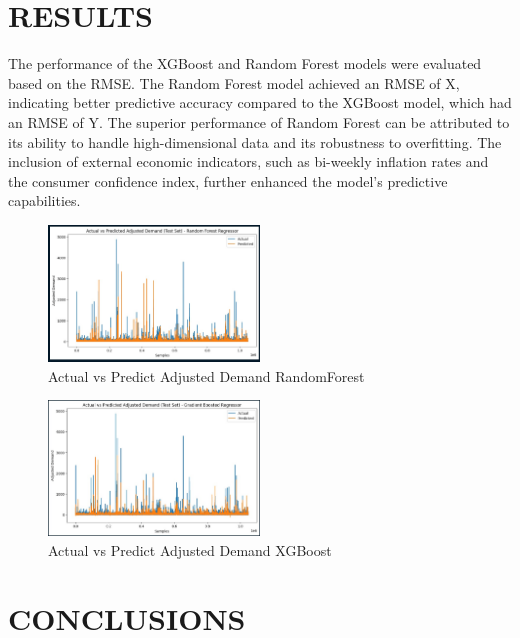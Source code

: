 \documentclass[letterpaper, 10 pt, conference]{ieeeconf}  %
\begin{document}
\section{RESULTS}
The performance of the XGBoost and Random Forest models were evaluated based on the RMSE. The Random Forest model achieved an RMSE of X, indicating better predictive accuracy compared to the XGBoost model, which had an RMSE of Y. The superior performance of Random Forest can be attributed to its ability to handle high-dimensional data and its robustness to overfitting. The inclusion of external economic indicators, such as bi-weekly inflation rates and the consumer confidence index, further enhanced the model's predictive capabilities.

\begin{figure}[H] 
        \begin{center}
        \centering
        \includegraphics[width=0.5\textwidth]{images/comparison.jpg}
        \caption{Actual vs Predict Adjusted Demand RandomForest}
        \end{center}
\end{figure} 

\begin{figure}[H] 
        \begin{center}
        \centering
        \includegraphics[width=0.5\textwidth]{images/comparisonxg.jpg}
        \caption{Actual vs Predict Adjusted Demand XGBoost}
        \end{center}
\end{figure} 


\section{CONCLUSIONS}
\end{document}
